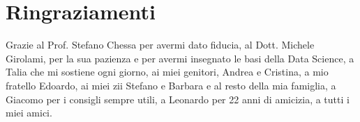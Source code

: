 \chapter*{Ringraziamenti}

Grazie al Prof. Stefano Chessa per avermi dato fiducia, 
al Dott. Michele Girolami, per la sua pazienza e per avermi insegnato le basi della Data Science,
a Talia che mi sostiene ogni giorno,
ai miei genitori, Andrea e Cristina,
a mio fratello Edoardo,
ai miei zii Stefano e Barbara e al resto della mia famiglia,
a Giacomo per i consigli sempre utili,
a Leonardo per 22 anni di amicizia,
a tutti i miei amici.